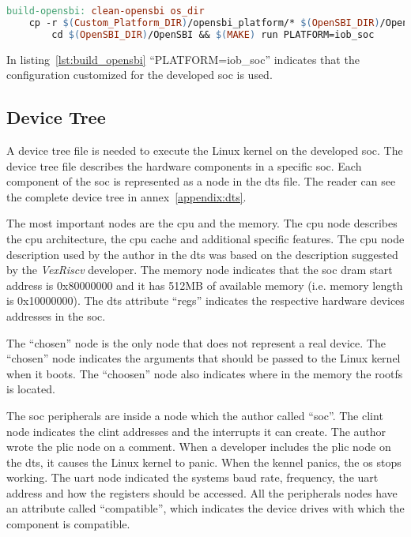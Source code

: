 \begin{lstlisting}[language=make, caption={Makefile target to build OpenSBI.}, label=lst:build_opensbi]
build-opensbi: clean-opensbi os_dir
    cp -r $(Custom_Platform_DIR)/opensbi_platform/* $(OpenSBI_DIR)/OpenSBI/platform/ && \
        cd $(OpenSBI_DIR)/OpenSBI && $(MAKE) run PLATFORM=iob_soc
\end{lstlisting}

In listing~\ref{lst:build_opensbi} \enquote{PLATFORM=iob\_soc} indicates that the configuration customized for the developed \acrshort{soc} is used.

\subsection{Device Tree}
A device tree file is needed to execute the Linux kernel on the developed \acrshort{soc}. The device tree file describes the hardware components in a specific \acrshort{soc}. Each component of the \acrshort{soc} is represented as a node in the \acrfull{dts} file. The reader can see the complete device tree in annex~\ref{appendix:dts}.

The most important nodes are the \acrshort{cpu} and the memory. The \acrshort{cpu} node describes the \acrshort{cpu} architecture, the \acrshort{cpu} cache and additional specific features. The \acrshort{cpu} node description used by the author in the \acrfull{dts} was based on the description suggested by the \textit{VexRiscv} developer. The memory node indicates that the \acrshort{soc} \acrshort{dram} start address is 0x80000000 and it has 512MB of available memory (i.e. memory length is 0x10000000). The \acrshort{dts} attribute \enquote{regs} indicates the respective hardware devices addresses in the \acrshort{soc}.

The \enquote{chosen} node is the only node that does not represent a real device. The \enquote{chosen} node indicates the arguments that should be passed to the Linux kernel when it boots. The \enquote{choosen} node also indicates where in the memory the \acrlong{rootfs} is located.

The \acrshort{soc} peripherals are inside a node which the author called \enquote{soc}. The \acrshort{clint} node indicates the  \acrshort{clint} addresses and the interrupts it can create. The author wrote the \acrshort{plic} node on a comment. When a developer includes the \acrshort{plic} node on the \acrshort{dts}, it causes the Linux kernel to panic. When the kennel panics, the \acrshort{os} stops working. The \acrshort{uart} node indicated the systems baud rate, frequency, the \acrshort{uart} address and how the registers should be accessed. All the peripherals nodes have an attribute called \enquote{compatible}, which indicates the device drives with which the component is compatible.

